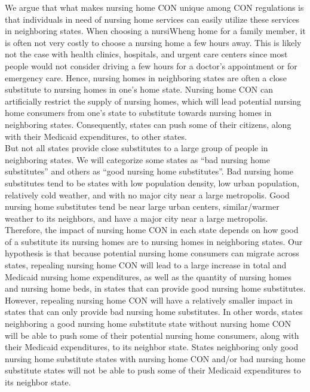 \documentclass[../Main.tex]{subfiles}
\begin{document}
\indent We argue that what makes nursing home CON unique among CON regulations is that individuals in need of nursing home services can easily utilize these services in neighboring states. When choosing a nursiWheng home for a family member, it is often not very costly to choose a nursing home a few hours away. This is likely not the case with health clinics, hospitals, and urgent care centers since most people would not consider driving a few hours for a doctor’s appointment or for emergency care. Hence, nursing homes in neighboring states are often a close substitute to nursing homes in one’s home state. Nursing home CON can artificially restrict the supply of nursing homes, which will lead potential nursing home consumers from one’s state to substitute towards nursing homes in neighboring states. Consequently, states can push some of their citizens, along with their Medicaid expenditures, to other states.\\
\indent But not all states provide close substitutes to a large group of people in neighboring states. We will categorize some states as “bad nursing home substitutes” and others as “good nursing home substitutes”. Bad nursing home substitutes tend to be states with low population density, low urban population, relatively cold weather, and with no major city near a large metropolis. Good nursing home substitutes tend be near large urban centers, similar/warmer weather to its neighbors, and have a major city near a large metropolis. Therefore, the impact of nursing home CON in each state depends on how good of a substitute its nursing homes are to nursing homes in neighboring states. Our hypothesis is that because potential nursing home consumers can migrate across states, repealing nursing home CON will lead to a large increase in total and Medicaid nursing home expenditures, as well as the quantity of nursing homes and nursing home beds, in states that can provide good nursing home substitutes. However, repealing nursing home CON will have a relatively smaller impact in states that can only provide bad nursing home substitutes. In other words, states neighboring a good nursing home substitute state without nursing home CON will be able to push some of their potential nursing home consumers, along with their Medicaid expenditures, to its neighbor state. States neighboring only good nursing home substitute states with nursing home CON and/or bad nursing home substitute states will not be able to push some of their Medicaid expenditures to its neighbor state.  \\
\end{document}
